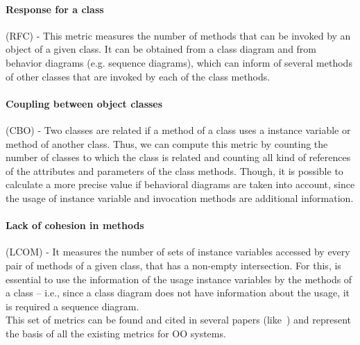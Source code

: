 \paragraph{Response for a class} (RFC) - This metric measures the number of methods that can be invoked by an object of a given class. It can be obtained from a class diagram and from behavior diagrams (e.g. sequence diagrams), which can inform of several methods of other classes that are invoked by each of the class methods.

\paragraph{Coupling between object classes} (CBO) - Two classes are related if a method of a class uses a instance variable or method of another class.
Thus, we can compute this metric by counting the number of classes to which the class is related and counting all kind of references of the attributes and parameters of the class methods.
Though, it is possible to calculate a more precise value if behavioral diagrams are taken into account, since the usage of instance variable and invocation methods are additional information.

\paragraph{Lack of cohesion in methods} (LCOM) - It measures the number of sets of instance variables accessed by every pair of methods of a given class, that has a non-empty intersection. For this, is essential to use the information of the usage instance variables by the methods of a class -- i.e., since a class diagram does not have information about the usage, it is required a sequence diagram.\\

This set of metrics can be found and cited in several papers (like~\cite{Power2}) and represent the basis of all the existing metrics for OO systems.

